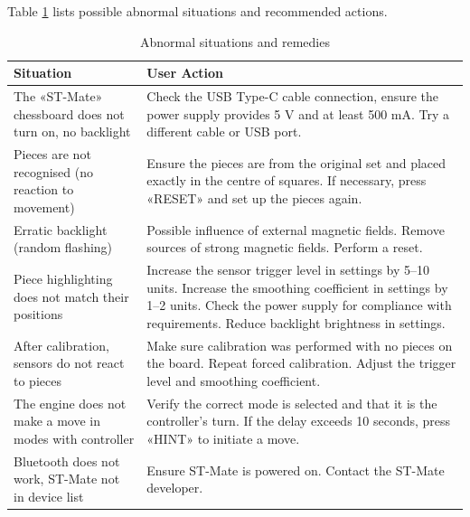 \documentclass[a4paper,12pt]{article}
\begin{document}
Table \ref{tab:errors} lists possible abnormal situations and recommended actions.
\begin{table}[H]
    \centering
    \begin{tabular}{|p{}|p{}|}
        \hline
        \textbf{Situation} & \textbf{User Action} \\
        \hline
        The «ST-Mate» chessboard does not turn on, no backlight & 
        Check the USB Type-C cable connection, ensure the power supply provides 5 V and at least 500 mA.
        Try a different cable or USB port. \\
        \hline
        Pieces are not recognised (no reaction to movement) & 
        Ensure the pieces are from the original set and placed exactly in the centre of squares.
        If necessary, press «RESET» and set up the pieces again. \\
        \hline
        Erratic backlight (random flashing) & 
        Possible influence of external magnetic fields.
        Remove sources of strong magnetic fields.
        Perform a reset. \\
        \hline
        Piece highlighting does not match their positions &
        Increase the sensor trigger level in settings by 5–10 units.
        Increase the smoothing coefficient in settings by 1–2 units.
        Check the power supply for compliance with requirements.
        Reduce backlight brightness in settings. \\
        \hline
        After calibration, sensors do not react to pieces & 
        Make sure calibration was performed with no pieces on the board.
        Repeat forced calibration.
        Adjust the trigger level and smoothing coefficient. \\
        \hline
        The engine does not make a move in modes with controller & 
        Verify the correct mode is selected and that it is the controller’s turn.
        If the delay exceeds 10 seconds, press «HINT» to initiate a move. \\
        \hline
        Bluetooth does not work, ST-Mate not in device list &
        Ensure ST-Mate is powered on. Contact the ST-Mate developer. \\
        \hline
    \end{tabular}
    \caption{Abnormal situations and remedies}
    \label{tab:errors}
\end{table}

\end{document}

